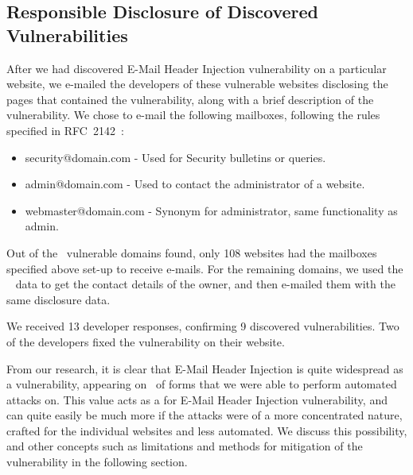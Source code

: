 \subsection{Responsible Disclosure of Discovered Vulnerabilities}
After we had discovered E-Mail Header Injection vulnerability on a particular website, we e-mailed the developers of these vulnerable websites disclosing the pages that contained the vulnerability, along with a brief description of the vulnerability.
We chose to e-mail the following mailboxes, following the rules specified in RFC~2142~\cite{rfc2142}:
\begin{itemize}
	\item security@domain.com - Used for Security bulletins or queries.
	\item admin@domain.com - Used to contact the administrator of a website.
	\item webmaster@domain.com - Synonym for administrator, same functionality as admin.
\end{itemize}

Out of the \domains\ vulnerable domains found, only 108 websites had the mailboxes specified above set-up to receive e-mails. For the remaining domains, we used the ~\cite{whois} data to get the contact details of the owner, and then e-mailed them with the same disclosure data.

We received 13 developer responses, confirming 9 discovered vulnerabilities. Two of the developers fixed the vulnerability on their website.

From our research, it is clear that E-Mail Header Injection is quite widespread as a vulnerability, appearing on \successDelta\ of forms that we were able to perform automated attacks on. This value acts as a  for E-Mail Header Injection vulnerability, and can quite easily be much more if the attacks were of a more concentrated nature, crafted for the individual websites and less automated. We discuss this possibility, and other concepts such as limitations and methods for mitigation of the vulnerability in the following section.